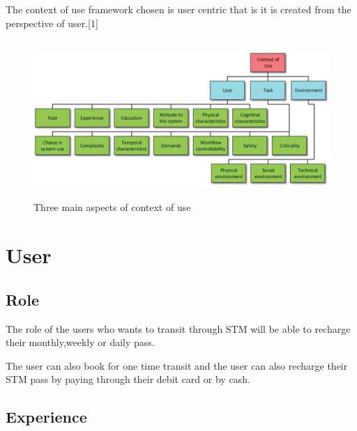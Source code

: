 \documentclass[12pt]{report}
\begin{document}
The context of use framework chosen is user centric that is it is created from the perspective of user.[1]\par


\vspace{\baselineskip}

\vspace{\baselineskip}



\begin{figure}[H]
	\begin{Center}
		\includegraphics[width=5.21in,height=2.36in]{./p2_image1.jpeg}
	\end{Center}
	\caption{Three main aspects of context of use}
\end{figure}



\par



\section{User}

\subsection{Role}

The role of the users who wants to transit through STM will be able to recharge their monthly,weekly or daily pass.\par

The user can also book for one time transit and the user can also recharge their STM pass by paying through their debit card or by cash.\par

\subsection{Experience}
\end{document}
